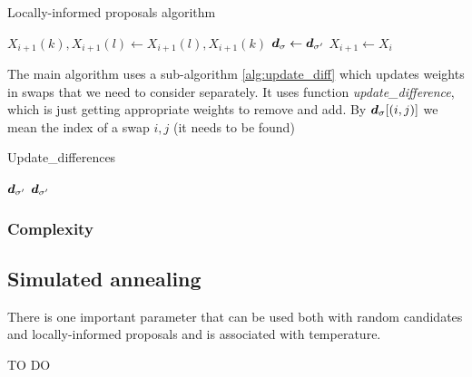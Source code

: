 		\begin{algorithm}[!htb]
			\caption{Locally-informed proposals algorithm}\label{alg:loc_neigh}
			\begin{algorithmic}[1]
				
					
					
					
						\State $X_{i+1}(k), X_{i+1}(l) \gets X_{i+1}(l), X_{i+1}(k)$
						\State $\bm{d}_{\sigma} \gets \bm{d}_{\sigma'}$
					\Else
						\State $X_{i+1} \gets X_i$
					\EndIf
				\EndFor
			\end{algorithmic}
		\end{algorithm}
		
		The main algorithm uses a sub-algorithm \ref{alg:update_diff} which updates weights in swaps that we need to consider separately. It uses function \textit{update\_difference}, which is just getting appropriate weights to remove and add. By $\bm{d}_\sigma[(i,j)]$ we mean the index of a swap $i,j$ (it needs to be found)
		\begin{algorithm}[!htb]
			\caption{Update\_differences}\label{alg:update_diff}
			\begin{algorithmic}[1]
				\Require $\bm{d}_{\sigma'}$
				\Ensure $\bm{d}_{\sigma'}$
						\EndIf
					\EndFor
				\EndFor
			\end{algorithmic}
		\end{algorithm}
		
	\subsubsection{Complexity}
	
\subsection{Simulated annealing}
	There is one important parameter that can be used both with random candidates and locally-informed proposals and is associated with temperature.
	
	TO DO